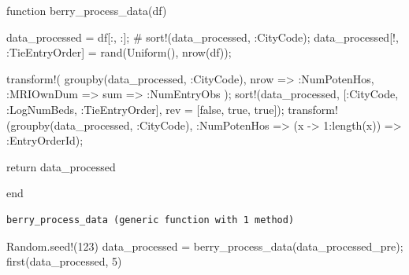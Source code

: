 \documentclass[
  letterpaper,
  DIV=11,
  numbers=noendperiod]{scrreprt}
\newenvironment{Shaded}{\begin{snugshade}}{\end{snugshade}}
\newcommand{\BuiltInTok}[1]{\textcolor[rgb]{0.00,0.23,0.31}{#1}}
\newcommand{\CommentTok}[1]{\textcolor[rgb]{0.37,0.37,0.37}{#1}}
\newcommand{\ConstantTok}[1]{\textcolor[rgb]{0.56,0.35,0.01}{#1}}
\newcommand{\ControlFlowTok}[1]{\textcolor[rgb]{0.00,0.23,0.31}{#1}}
\newcommand{\FloatTok}[1]{\textcolor[rgb]{0.68,0.00,0.00}{#1}}
\newcommand{\FunctionTok}[1]{\textcolor[rgb]{0.28,0.35,0.67}{#1}}
\newcommand{\KeywordTok}[1]{\textcolor[rgb]{0.00,0.23,0.31}{#1}}
\newcommand{\NormalTok}[1]{\textcolor[rgb]{0.00,0.23,0.31}{#1}}
\newcommand{\OperatorTok}[1]{\textcolor[rgb]{0.37,0.37,0.37}{#1}}
\begin{document}
\begin{Shaded}
\begin{Highlighting}[]
\KeywordTok{function} \FunctionTok{berry\_process\_data}\NormalTok{(df)}
    
\NormalTok{    data\_processed }\OperatorTok{=}\NormalTok{ df[}\OperatorTok{:}\NormalTok{, }\OperatorTok{:}\NormalTok{];}
\CommentTok{\#     sort!(data\_processed, :CityCode);}
\NormalTok{    data\_processed[!, }\OperatorTok{:}\NormalTok{TieEntryOrder] }\OperatorTok{=} \FunctionTok{rand}\NormalTok{(}\FunctionTok{Uniform}\NormalTok{(), }\FunctionTok{nrow}\NormalTok{(df));}
    
    \FunctionTok{transform!}\NormalTok{(}
        \FunctionTok{groupby}\NormalTok{(data\_processed, }\OperatorTok{:}\NormalTok{CityCode),}
\NormalTok{        nrow }\OperatorTok{=\textgreater{}} \OperatorTok{:}\NormalTok{NumPotenHos,}
        \OperatorTok{:}\NormalTok{MRIOwnDum }\OperatorTok{=\textgreater{}}\NormalTok{ sum }\OperatorTok{=\textgreater{}} \OperatorTok{:}\NormalTok{NumEntryObs}
\NormalTok{    );}
    \FunctionTok{sort!}\NormalTok{(data\_processed, [}\OperatorTok{:}\NormalTok{CityCode, }\OperatorTok{:}\NormalTok{LogNumBeds, }\OperatorTok{:}\NormalTok{TieEntryOrder], rev }\OperatorTok{=}\NormalTok{ [}\ConstantTok{false}\NormalTok{, }\ConstantTok{true}\NormalTok{, }\ConstantTok{true}\NormalTok{]);}
    \FunctionTok{transform!}\NormalTok{(}\FunctionTok{groupby}\NormalTok{(data\_processed, }\OperatorTok{:}\NormalTok{CityCode), }\OperatorTok{:}\NormalTok{NumPotenHos }\OperatorTok{=\textgreater{}}\NormalTok{ (x }\OperatorTok{{-}\textgreater{}} \FloatTok{1}\OperatorTok{:}\FunctionTok{length}\NormalTok{(x)) }\OperatorTok{=\textgreater{}} \OperatorTok{:}\NormalTok{EntryOrderId);}
    
    \ControlFlowTok{return}\NormalTok{ data\_processed}
        
\KeywordTok{end}
\end{Highlighting}
\end{Shaded}

\begin{verbatim}
berry_process_data (generic function with 1 method)
\end{verbatim}

\begin{Shaded}
\begin{Highlighting}[]
\BuiltInTok{Random}\NormalTok{.}\FunctionTok{seed!}\NormalTok{(}\FloatTok{123}\NormalTok{)}
\NormalTok{data\_processed }\OperatorTok{=} \FunctionTok{berry\_process\_data}\NormalTok{(data\_processed\_pre);}
\FunctionTok{first}\NormalTok{(data\_processed, }\FloatTok{5}\NormalTok{)}
\end{Highlighting}
\end{Shaded}
\end{document}
